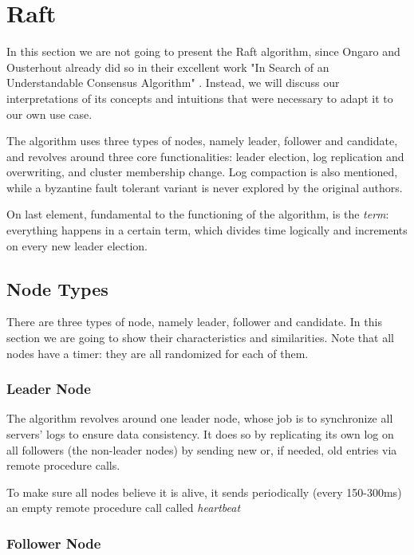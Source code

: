 \section{Raft}

In this section we are not going to present the Raft algorithm, since Ongaro and Ousterhout already did so in their excellent work "In Search of an Understandable Consensus Algorithm" \cite{raft}. Instead, we will discuss our interpretations of its concepts and intuitions that were necessary to adapt it to our own use case.

The algorithm uses three types of nodes, namely leader, follower and candidate, and revolves around three core functionalities: leader election, log replication and overwriting, and cluster membership change. Log compaction is also mentioned, while a byzantine fault tolerant variant is never explored by the original authors.

On last element, fundamental to the functioning of the algorithm, is the \textit{term}: everything happens in a certain term, which divides time logically and increments on every new leader election. 

\subsection{Node Types}

There are three types of node, namely leader, follower and candidate. In this section we are going to show their characteristics and similarities. Note that all nodes have a timer: they are all randomized for each of them.

\subsubsection{Leader Node}

The algorithm revolves around one leader node, whose job is to synchronize all servers' logs to ensure data consistency. It does so by replicating its own log on all followers (the non-leader nodes) by sending new or, if needed, old entries via remote procedure calls. 

To make sure all nodes believe it is alive, it sends periodically (every 150-300ms) an empty remote procedure call called \textit{heartbeat}

\subsubsection{Follower Node}

